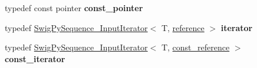 \begin{DoxyCompactItemize}
typedef const pointer {\bfseries const\+\_\+pointer}
\item 
\mbox{\label{structswig_1_1_swig_py_sequence___cont_abcd331d0657a109f34c0fd84c5be87dd}} 
typedef \hyperlink{structswig_1_1_swig_py_sequence___input_iterator}{Swig\+Py\+Sequence\+\_\+\+Input\+Iterator}$<$ T, \hyperlink{structswig_1_1_swig_py_sequence___ref}{reference} $>$ {\bfseries iterator}
\item 
\mbox{\label{structswig_1_1_swig_py_sequence___cont_a708a6b3790b68aa53bd79d27a2c16b89}} 
typedef \hyperlink{structswig_1_1_swig_py_sequence___input_iterator}{Swig\+Py\+Sequence\+\_\+\+Input\+Iterator}$<$ T, \hyperlink{structswig_1_1_swig_py_sequence___ref}{const\+\_\+reference} $>$ {\bfseries const\+\_\+iterator}
\end{DoxyCompactItemize}
